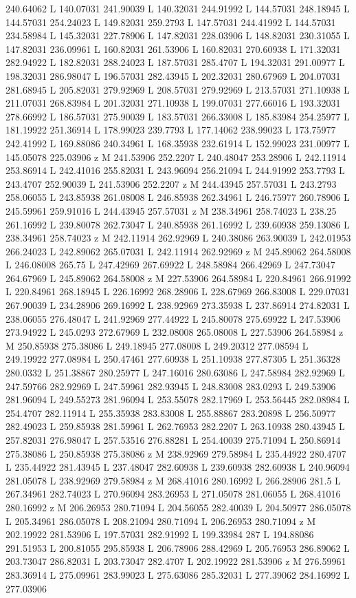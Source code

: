 {\begin{scope}[local bounding box=bb]
{240.64062 L 140.07031 241.90039 L 140.32031 244.91992 L 144.57031 248.18945 L 144.57031 254.24023 L 149.82031 259.2793 L 147.57031 244.41992 L 144.57031 234.58984 L 145.32031 227.78906 L 147.82031 228.03906 L 148.82031 230.31055 L 147.82031 236.09961 L 160.82031 261.53906 L 160.82031 270.60938 L 171.32031 282.94922 L 182.82031 288.24023 L 187.57031 285.4707 L 194.32031 291.00977 L 198.32031 286.98047 L 196.57031 282.43945 L 202.32031 280.67969 L 204.07031 281.68945 L 205.82031 279.92969 L 208.57031 279.92969 L 213.57031 271.10938 L 211.07031 268.83984 L 201.32031 271.10938 L 199.07031 277.66016 L 193.32031 278.66992 L 186.57031 275.90039 L 183.57031 266.33008 L 185.83984 254.25977 L 181.19922 251.36914 L 178.99023 239.7793 L 177.14062 238.99023 L 173.75977 242.41992 L 169.88086 240.34961 L 168.35938 232.61914 L 152.99023 231.00977 L 145.05078 225.03906 z M 241.53906 252.2207 L 240.48047 253.28906 L 242.11914 253.86914 L 242.41016 255.82031 L 243.96094 256.21094 L 244.91992 253.7793 L 243.4707 252.90039 L 241.53906 252.2207 z M 244.43945 257.57031 L 243.2793 258.06055 L 243.85938 261.08008 L 246.85938 262.34961 L 246.75977 260.78906 L 245.59961 259.91016 L 244.43945 257.57031 z M 238.34961 258.74023 L 238.25 261.16992 L 239.80078 262.73047 L 240.85938 261.16992 L 239.60938 259.13086 L 238.34961 258.74023 z M 242.11914 262.92969 L 240.38086 263.90039 L 242.01953 266.24023 L 242.89062 265.07031 L 242.11914 262.92969 z M 245.89062 264.58008 L 246.08008 265.75 L 247.42969 267.69922 L 248.58984 266.42969 L 247.73047 264.67969 L 245.89062 264.58008 z M 227.53906 264.58984 L 220.84961 266.91992 L 220.84961 268.18945 L 226.16992 268.28906 L 228.67969 266.83008 L 229.07031 267.90039 L 234.28906 269.16992 L 238.92969 273.35938 L 237.86914 274.82031 L 238.06055 276.48047 L 241.92969 277.44922 L 245.80078 275.69922 L 247.53906 273.94922 L 245.0293 272.67969 L 232.08008 265.08008 L 227.53906 264.58984 z M 250.85938 275.38086 L 249.18945 277.08008 L 249.20312 277.08594 L 249.19922 277.08984 L 250.47461 277.60938 L 251.10938 277.87305 L 251.36328 280.0332 L 251.38867 280.25977 L 247.16016 280.63086 L 247.58984 282.92969 L 247.59766 282.92969 L 247.59961 282.93945 L 248.83008 283.0293 L 249.53906 281.96094 L 249.55273 281.96094 L 253.55078 282.17969 L 253.56445 282.08984 L 254.4707 282.11914 L 255.35938 283.83008 L 255.88867 283.20898 L 256.50977 282.49023 L 259.85938 281.59961 L 262.76953 282.2207 L 263.10938 280.43945 L 257.82031 276.98047 L 257.53516 276.88281 L 254.40039 275.71094 L 250.86914 275.38086 L 250.85938 275.38086 z M 238.92969 279.58984 L 235.44922 280.4707 L 235.44922 281.43945 L 237.48047 282.60938 L 239.60938 282.60938 L 240.96094 281.05078 L 238.92969 279.58984 z M 268.41016 280.16992 L 266.28906 281.5 L 267.34961 282.74023 L 270.96094 283.26953 L 271.05078 281.06055 L 268.41016 280.16992 z M 206.26953 280.71094 L 204.56055 282.40039 L 204.50977 286.05078 L 205.34961 286.05078 L 208.21094 280.71094 L 206.26953 280.71094 z M 202.19922 281.53906 L 197.57031 282.91992 L 199.33984 287 L 194.88086 291.51953 L 200.81055 295.85938 L 206.78906 288.42969 L 205.76953 286.89062 L 203.73047 286.82031 L 203.73047 282.4707 L 202.19922 281.53906 z M 276.59961 283.36914 L 275.09961 283.99023 L 275.63086 285.32031 L 277.39062 284.16992 L 277.03906 }
\end{scope}}
